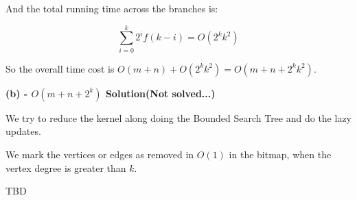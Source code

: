 \documentclass[12pt]{article}
\begin{document}
And the total running time across the branches is:

\begin{equation}
\sum_{i=0}^{k} 2^i f(k-i) = O(2^k k^2)
\end{equation}

So the overall time cost is $O(m+n)+O(2^k k^2) = O(m+n+2^k k^2)$.

\textbf{(b) - $O(m+n+2^k)$ Solution(Not solved...)}

We try to reduce the kernel along doing the Bounded Search Tree and do the lazy updates.

We mark the vertices or edges as removed in $O(1)$ in the bitmap, when the vertex degree is greater than $k$.

TBD
\end{document}
